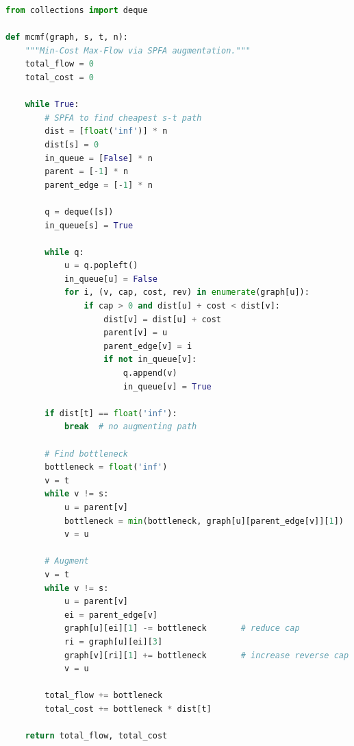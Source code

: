 \begin{lstlisting}[language=Python]
from collections import deque

def mcmf(graph, s, t, n):
    """Min-Cost Max-Flow via SPFA augmentation."""
    total_flow = 0
    total_cost = 0

    while True:
        # SPFA to find cheapest s-t path
        dist = [float('inf')] * n
        dist[s] = 0
        in_queue = [False] * n
        parent = [-1] * n
        parent_edge = [-1] * n

        q = deque([s])
        in_queue[s] = True

        while q:
            u = q.popleft()
            in_queue[u] = False
            for i, (v, cap, cost, rev) in enumerate(graph[u]):
                if cap > 0 and dist[u] + cost < dist[v]:
                    dist[v] = dist[u] + cost
                    parent[v] = u
                    parent_edge[v] = i
                    if not in_queue[v]:
                        q.append(v)
                        in_queue[v] = True

        if dist[t] == float('inf'):
            break  # no augmenting path

        # Find bottleneck
        bottleneck = float('inf')
        v = t
        while v != s:
            u = parent[v]
            bottleneck = min(bottleneck, graph[u][parent_edge[v]][1])
            v = u

        # Augment
        v = t
        while v != s:
            u = parent[v]
            ei = parent_edge[v]
            graph[u][ei][1] -= bottleneck       # reduce cap
            ri = graph[u][ei][3]
            graph[v][ri][1] += bottleneck       # increase reverse cap
            v = u

        total_flow += bottleneck
        total_cost += bottleneck * dist[t]

    return total_flow, total_cost
\end{lstlisting}
